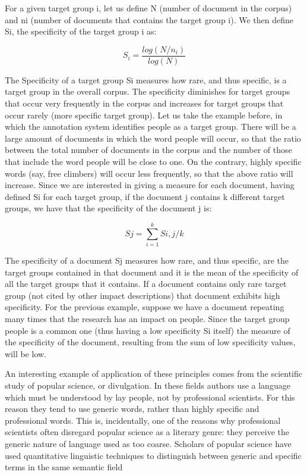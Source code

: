 \documentclass[b5paper,]{book}
\theoremstyle{definition}
\theoremstyle{definition}
\theoremstyle{definition}
\theoremstyle{remark}
\begin{document}
For a given target group i, let us define N (number of document in the
corpus) and ni (number of documents that contains the target group i).
We then define Si, the specificity of the target group i as:

\begin{equation*} 
S_i= \frac{log(N/n_i)}{log(N)}
\end{equation*}

The Specificity of a target group Si measures how rare, and thus
specific, is a target group in the overall corpus. The specificity
diminishes for target groups that occur very frequently in the corpus
and increases for target groups that occur rarely (more specific target
group). Let us take the example before, in which the annotation system
identifies people as a target group. There will be a large amount of
documents in which the word people will occur, so that the ratio between
the total number of documents in the corpus and the number of those that
include the word people will be close to one. On the contrary, highly
specific words (say, free climbers) will occur less frequently, so that
the above ratio will increase. Since we are interested in giving a
measure for each document, having defined Si for each target group, if
the document j contains k different target groups, we have that the
specificity of the document j is:

\begin{equation*} 
Sj=\sum_{i=1}^{k}Si,j/k
\end{equation*}

The specificity of a document Sj measures how rare, and thus specific,
are the target groups contained in that document and it is the mean of
the specificity of all the target groups that it contains. If a document
contains only rare target group (not cited by other impact descriptions)
that document exhibits high specificity. For the previous example,
suppose we have a document repeating many times that the research has an
impact on people. Since the target group people is a common one (thus
having a low specificity Si itself) the measure of the specificity of
the document, resulting from the sum of low specificity values, will be
low.

An interesting example of application of these principles comes from the
scientific study of popular science, or divulgation. In these fields
authors use a language which must be understood by lay people, not by
professional scientists. For this reason they tend to use generic words,
rather than highly specific and professional words. This is,
incidentally, one of the reasons why professional scientists often
disregard popular science as a literary genre: they perceive the generic
nature of language used as too coarse. Scholars of popular science have
used quantitative linguistic techniques to distinguish between generic
and specific terms in the same semantic field
\citep{jacobi1999communication}
\end{document}
